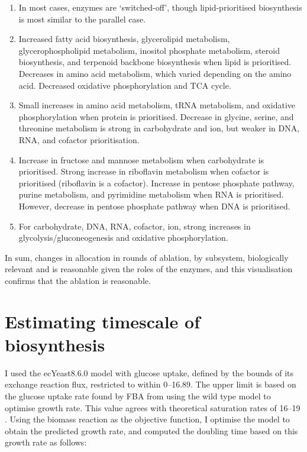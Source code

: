 \begin{enumerate}
  \item In most cases, enzymes are `switched-off', though lipid-prioritised biosynthesis is most similar to the parallel case.
  \item Increased fatty acid biosynthesis, glycerolipid metabolism, glycerophospholipid metabolism, inositol phosphate metabolism, steroid biosynthesis, and terpenoid backbone biosynthesis when lipid is prioritised.
        Decreases in amino acid metabolism, which varied depending on the amino acid.
        Decreased oxidative phosphorylation and TCA cycle.
  \item Small increases in amino acid metabolism, tRNA metabolism, and oxidative phosphorylation when protein is prioritised.
        Decrease in glycine, serine, and threonine metabolism is strong in carbohydrate and ion, but weaker in DNA, RNA, and cofactor prioritisation.
  \item Increase in fructose and mannose metabolism when carbohydrate is prioritised.
        Strong increase in riboflavin metabolism when cofactor is prioritised (riboflavin is a cofactor).
        Increase in pentose phosphate pathway, purine metabolism, and pyrimidine metabolism when RNA is prioritised.
        However, decrease in pentose phosphate pathway when DNA is prioritised.
  \item For carbohydrate, DNA, RNA, cofactor, ion, strong increases in glycolysis/glu\-co\-neo\-ge\-ne\-sis and oxidative phosphorylation.
\end{enumerate}

In sum, changes in allocation in rounds of ablation, by subsystem, biologically relevant and is reasonable given the roles of the enzymes, and this visualisation confirms that the ablation is reasonable.

\section{Estimating timescale of biosynthesis}
\label{sec:model-timescale}

I used the ecYeast8.6.0 model with glucose uptake, defined by the bounds of its exchange reaction flux, restricted to within \SIrange{0}{16.89}{\mmolgdw}.
The upper limit is based on the glucose uptake rate found by FBA from using the wild type model to optimise growth rate.
This value agrees with theoretical saturation rates of \SIrange{16}{19}{\mmolgdw} \parencite{blankTCACycleActivity2004}.
Using the biomass reaction as the objective function, I optimise the model to obtain the predicted growth rate, and computed the doubling time based on this growth rate as follows:

